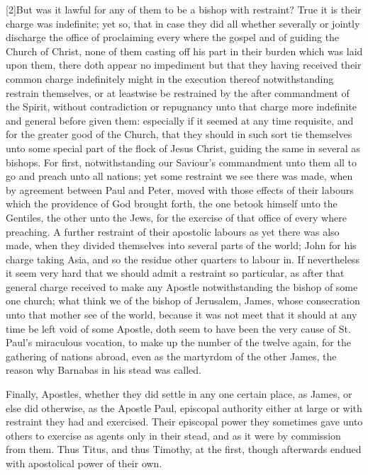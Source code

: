 [2]But was it lawful for any of them to be a bishop with restraint? True it is their charge was indefinite; yet so, that in case they did all whether severally or jointly discharge the office of proclaiming every where the gospel and of guiding the Church of Christ, none of them casting off his part in their burden which was laid upon them, there doth appear no impediment but that they having received their common charge indefinitely might in the execution thereof notwithstanding  restrain themselves, or at leastwise be restrained by the after commandment of the Spirit,
 without contradiction or repugnancy unto that charge more indefinite and general before given them: especially if it seemed at any time requisite, and for the greater good of the Church, that they should in such sort tie themselves unto some special part of the flock of Jesus Christ, guiding the same in several as bishops. For first, notwithstanding our Saviour’s commandment unto them all to go and preach unto all nations; yet some restraint we see there was made, when by agreement between Paul and Peter, moved with those effects of their labours which the providence of God brought forth, the one betook himself unto the Gentiles, the other unto the Jews, for the exercise of that office of every where preaching. A further restraint of their apostolic labours as yet there was also made, when they divided themselves into several parts of the world; John for his charge taking Asia, and so the residue other quarters to labour in. If nevertheless it seem very hard that we should admit a restraint so particular, as after that general charge received to make any Apostle notwithstanding the bishop of some one church; what think we of the bishop of Jerusalem, James, whose consecration unto that mother see  of the world,
 because it was not meet that it should at any time be left void of some Apostle, doth seem to have been the very cause of St. Paul’s miraculous vocation, to make up the number of the twelve again, for the gathering of nations abroad, even as the martyrdom of the other James, the reason why Barnabas in his stead was called.

Finally, Apostles, whether they did settle in any one certain place, as James, or else did otherwise, as the Apostle Paul, episcopal authority either at large or with restraint they had and exercised. Their episcopal power they sometimes gave unto others to exercise as agents only in their stead, and as it were by commission from them. Thus Titus, and thus Timothy, at the first, though afterwards endued with apostolical power of their own.

